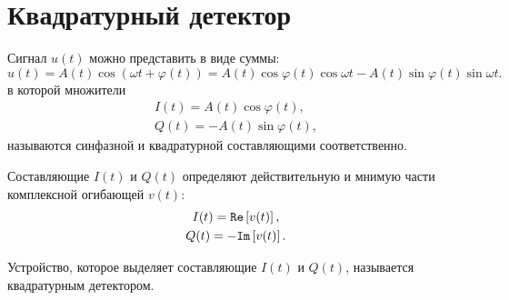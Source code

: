 \section{Квадратурный детектор}

Сигнал $u(t)$ можно представить в виде суммы:
\[
    u(t)
    = A(t) \cos ( \omega t + \varphi(t) )
    = A(t) \cos \varphi(t) \cos \omega t - A(t) \sin \varphi(t) \sin \omega t .
\]
в которой множители
\begin{gather*}
    I(t) = A(t) \cos \varphi(t) , \\
    Q(t) = - A(t) \sin \varphi(t) ,
\end{gather*}
называются синфазной и квадратурной составляющими соответственно.

Составляющие $I(t)$ и $Q(t)$ определяют действительную и мнимую части комплексной огибающей $v(t)$:
\begin{gather*}
    I(t) = \mathtt{Re} \left [ v(t) \right ] , \\
    Q(t) = - \mathtt{Im} \left [ v(t) \right ] .
\end{gather*}

Устройство, которое выделяет составляющие $I(t)$ и $Q(t)$, называется квадратурным детектором.